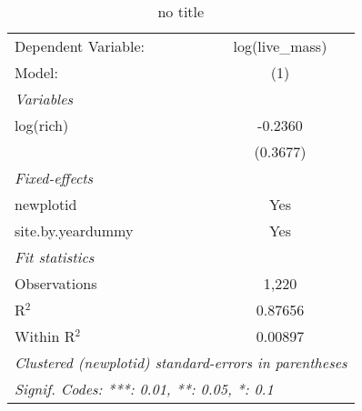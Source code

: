 
\begin{table}[htbp]
   \caption{no title}
   \centering
   \begin{tabular}{lc}
      \tabularnewline \midrule \midrule
      Dependent Variable: & log(live\_mass)\\   
      Model:              & (1)\\  
      \midrule
      \emph{Variables}\\
      log(rich)           & -0.2360\\   
                          & (0.3677)\\   
      \midrule
      \emph{Fixed-effects}\\
      newplotid           & Yes\\  
      site.by.yeardummy   & Yes\\  
      \midrule
      \emph{Fit statistics}\\
      Observations        & 1,220\\  
      R$^2$               & 0.87656\\  
      Within R$^2$        & 0.00897\\  
      \midrule \midrule
      \multicolumn{2}{l}{\emph{Clustered (newplotid) standard-errors in parentheses}}\\
      \multicolumn{2}{l}{\emph{Signif. Codes: ***: 0.01, **: 0.05, *: 0.1}}\\
   \end{tabular}
\end{table}



